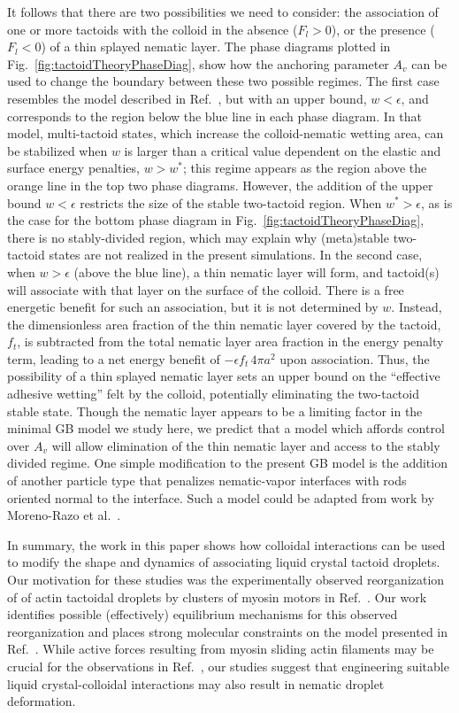 \documentclass[%
 aip,
 amsmath,amssymb,
 reprint,%
]{revtex4-1}
\begin{document}
It follows that there are two possibilities we need to consider: the association of one or more tactoids with the colloid in the absence ($F_{l} > 0$), or the presence ($F_{l} < 0$) of a thin splayed nematic layer. The phase diagrams plotted in Fig.~\ref{fig:tactoidTheoryPhaseDiag}, show how the anchoring parameter $A_v$ can be used to change the boundary between these two possible regimes. The first case resembles the model described in Ref.~, but with an upper bound, $w<\epsilon$, and corresponds to the region below the blue line in each phase diagram. In that model, multi-tactoid states, which increase the colloid-nematic wetting area, can be stabilized when $w$ is larger than a critical value dependent on the elastic and surface energy penalties, $w > w^*$; this regime appears as the region above the orange line in the top two phase diagrams. However, the addition of the upper bound $w<\epsilon$ restricts the size of the stable two-tactoid region. When $w^*>\epsilon$, as is the case for the bottom phase diagram in Fig.~\ref{fig:tactoidTheoryPhaseDiag}, there is no stably-divided region, which may explain why (meta)stable two-tactoid states are not realized in the present simulations. In the second case, when $w>\epsilon$ (above the blue line), a thin nematic layer will form, and tactoid(s) will associate with that layer on the surface of the colloid. There is a free energetic benefit for such an association, but it is not determined by $w$. Instead, the dimensionless area fraction of the thin nematic layer covered by the tactoid, $f_t$, is subtracted from the total nematic layer area fraction in the energy penalty term, leading to a net energy benefit of $-\epsilon f_t \, 4\pi a^2$ upon association. Thus, the possibility of a thin splayed nematic layer sets an upper bound on the ``effective adhesive wetting'' felt by the colloid, potentially eliminating the two-tactoid stable state. Though the nematic layer appears to be a limiting factor in the minimal GB model we study here, we predict that a model which affords control over $A_v$ will allow elimination of the thin nematic layer and access to the stably divided regime. One simple modification to the present GB model is the addition of another particle type that penalizes nematic-vapor interfaces with rods oriented normal to the interface. Such a model could be adapted from work by Moreno-Razo et al.~\cite{dePablo12}.

In summary, the work in this paper shows how colloidal interactions can be used to modify the shape and dynamics of associating liquid crystal tactoid droplets. Our motivation for these studies was the experimentally observed reorganization of of actin tactoidal droplets by clusters of myosin motors in Ref.~. Our work identifies possible (effectively) equilibrium mechanisms for this observed reorganization and places strong molecular constraints on the model presented in Ref.~. While active forces resulting from myosin sliding actin filaments may be crucial for the observations in Ref.~, our studies suggest that engineering suitable liquid crystal-colloidal interactions may also result in nematic droplet deformation.
\end{document}
